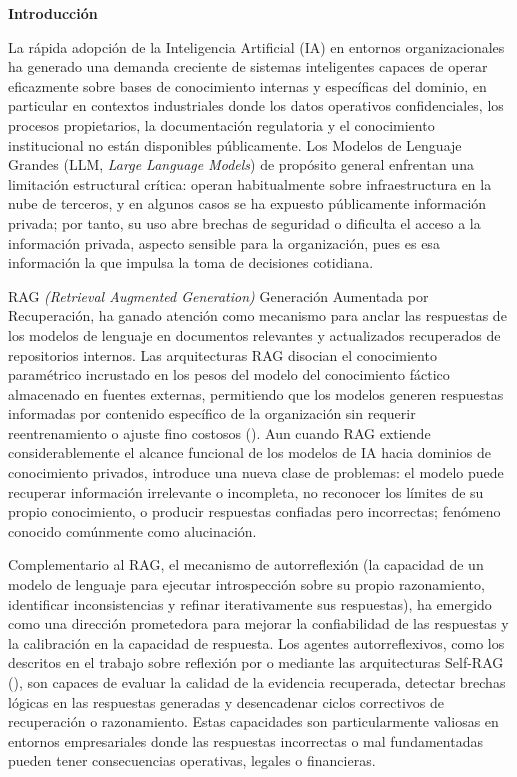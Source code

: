 \begin{center}
{\fontsize{14}{17}\selectfont\bfseries Introducción}
\end{center}

La rápida adopción de la Inteligencia Artificial (IA) en entornos organizacionales ha generado una demanda creciente de sistemas inteligentes capaces de operar eficazmente sobre bases de conocimiento internas y específicas del dominio, en particular en contextos industriales donde los datos operativos confidenciales, los procesos propietarios, la documentación regulatoria y el conocimiento institucional no están disponibles públicamente. Los Modelos de Lenguaje Grandes (LLM, \textit{Large Language Models}) de propósito general enfrentan una limitación estructural crítica: operan habitualmente sobre infraestructura en la nube de terceros, y en algunos casos se ha expuesto públicamente información privada; por tanto, su uso abre brechas de seguridad o dificulta el acceso a la información privada, aspecto sensible para la organización, pues es esa información la que impulsa la toma de decisiones cotidiana.

RAG \textit{(Retrieval Augmented Generation)} Generación Aumentada por Recuperación, ha ganado atención como mecanismo para anclar las respuestas de los modelos de lenguaje en documentos relevantes y actualizados recuperados de repositorios internos. Las arquitecturas RAG disocian el conocimiento paramétrico incrustado en los pesos del modelo del conocimiento fáctico almacenado en fuentes externas, permitiendo que los modelos generen respuestas informadas por contenido específico de la organización sin requerir reentrenamiento o ajuste fino costosos (\cite{Lewis2020rag}). Aun cuando RAG extiende considerablemente el alcance funcional de los modelos de IA hacia dominios de conocimiento privados, introduce una nueva clase de problemas: el modelo puede recuperar información irrelevante o incompleta, no reconocer los límites de su propio conocimiento, o producir respuestas confiadas pero incorrectas; fenómeno conocido comúnmente como alucinación.

Complementario al RAG, el mecanismo de autorreflexión (la capacidad de un modelo de lenguaje para ejecutar introspección sobre su propio razonamiento, identificar inconsistencias y refinar iterativamente sus respuestas), ha emergido como una dirección prometedora para mejorar la confiabilidad de las respuestas y la calibración en la capacidad de respuesta. Los agentes autorreflexivos, como los descritos en el trabajo sobre reflexión por \textcite{Shinn2023_Reflexion} o mediante las arquitecturas Self-RAG (\cite{Asai2024_Selfrag}), son capaces de evaluar la calidad de la evidencia recuperada, detectar brechas lógicas en las respuestas generadas y desencadenar ciclos correctivos de recuperación o razonamiento. Estas capacidades son particularmente valiosas en entornos empresariales donde las respuestas incorrectas o mal fundamentadas pueden tener consecuencias operativas, legales o financieras.

